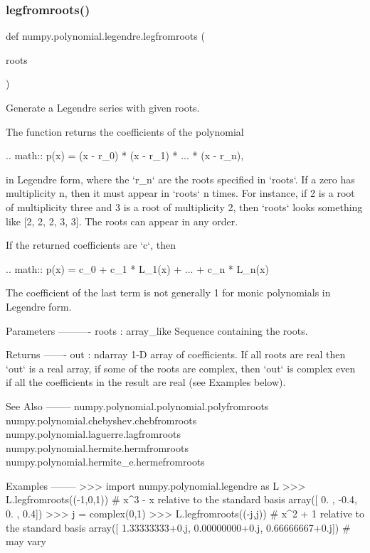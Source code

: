  \mbox{\label{namespacenumpy_1_1polynomial_1_1legendre_a77e979bb265a23eed2e9625d13f54299}} 
\subsubsection{\texorpdfstring{legfromroots()}{legfromroots()}}
{\footnotesize\ttfamily def numpy.\+polynomial.\+legendre.\+legfromroots (\begin{DoxyParamCaption}\item[{}]{roots }\end{DoxyParamCaption})}

\begin{DoxyVerb}Generate a Legendre series with given roots.

The function returns the coefficients of the polynomial

.. math:: p(x) = (x - r_0) * (x - r_1) * ... * (x - r_n),

in Legendre form, where the `r_n` are the roots specified in `roots`.
If a zero has multiplicity n, then it must appear in `roots` n times.
For instance, if 2 is a root of multiplicity three and 3 is a root of
multiplicity 2, then `roots` looks something like [2, 2, 2, 3, 3]. The
roots can appear in any order.

If the returned coefficients are `c`, then

.. math:: p(x) = c_0 + c_1 * L_1(x) + ... +  c_n * L_n(x)

The coefficient of the last term is not generally 1 for monic
polynomials in Legendre form.

Parameters
----------
roots : array_like
    Sequence containing the roots.

Returns
-------
out : ndarray
    1-D array of coefficients.  If all roots are real then `out` is a
    real array, if some of the roots are complex, then `out` is complex
    even if all the coefficients in the result are real (see Examples
    below).

See Also
--------
numpy.polynomial.polynomial.polyfromroots
numpy.polynomial.chebyshev.chebfromroots
numpy.polynomial.laguerre.lagfromroots
numpy.polynomial.hermite.hermfromroots
numpy.polynomial.hermite_e.hermefromroots

Examples
--------
>>> import numpy.polynomial.legendre as L
>>> L.legfromroots((-1,0,1)) # x^3 - x relative to the standard basis
array([ 0. , -0.4,  0. ,  0.4])
>>> j = complex(0,1)
>>> L.legfromroots((-j,j)) # x^2 + 1 relative to the standard basis
array([ 1.33333333+0.j,  0.00000000+0.j,  0.66666667+0.j]) # may vary\end{DoxyVerb}
 \mbox{\label{namespacenumpy_1_1polynomial_1_1legendre_a1009917878b9bf8953b616bd627a292f}} 
